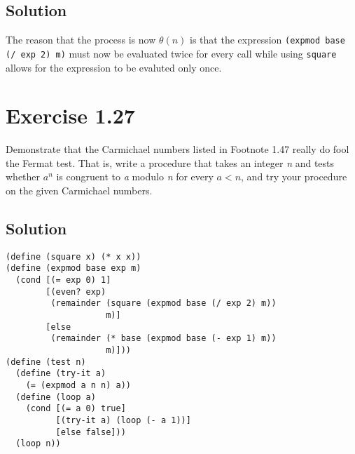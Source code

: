 \documentclass[11pt]{article}
\begin{document}
\subsection{Solution}
\label{sec:orgfe7ed83}
The reason that the process is now \(\theta(n)\) is that the expression
\texttt{(expmod base (/ exp 2) m)} must now be evaluated twice for every call while
using \texttt{square} allows for the expression to be evaluted only once.
\section{Exercise 1.27}
\label{sec:orge743f88}
Demonstrate that the Carmichael numbers listed in Footnote 1.47 really do fool
the Fermat test. That is, write a procedure that takes an integer \emph{n} and
tests whether \(a^n\) is congruent to \emph{a} modulo \emph{n} for every \(a < n\),
and try your procedure on the given Carmichael numbers.
\subsection{Solution}
\label{sec:org90d2632}
\begin{verbatim}
(define (square x) (* x x))
(define (expmod base exp m)
  (cond [(= exp 0) 1]
        [(even? exp)
         (remainder (square (expmod base (/ exp 2) m))
                    m)]
        [else
         (remainder (* base (expmod base (- exp 1) m))
                    m)]))
(define (test n)
  (define (try-it a)
    (= (expmod a n n) a))
  (define (loop a)
    (cond [(= a 0) true]
          [(try-it a) (loop (- a 1))]
          [else false]))
  (loop n))
\end{verbatim}
\end{document}
